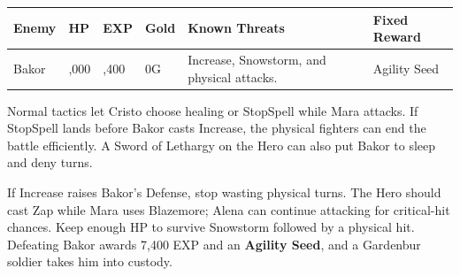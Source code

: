 \documentclass[
  american,
  10pt,
  letterpaper,
  oneside,
  open=any]{scrreprt}
\newcounter{none} %
\newenvironment{guidetable}{%
  \small\setstretch{1.0}%
  \setlength{\tabcolsep}{4pt}%
  \setlength{\LTpre}{8pt}\setlength{\LTpost}{10pt}%
  \renewcommand{\arraystretch}{1.16}%
}{ }
\begin{document}
\begin{guidetable}

{\def\LTcaptype{none} %
\begin{longtable}[]{@{}
  >{\raggedright\arraybackslash}p{}
  >{\raggedleft\arraybackslash}p{}
  >{\raggedleft\arraybackslash}p{}
  >{\raggedleft\arraybackslash}p{}
  >{\raggedright\arraybackslash}p{}
  >{\raggedright\arraybackslash}p{}@{}}
\toprule\noalign{}
\begin{minipage}[b]{\linewidth}\raggedright
\color{GuideGreen}\bfseries Enemy
\end{minipage} & \begin{minipage}[b]{\linewidth}\raggedleft
\color{GuideGreen}\bfseries HP
\end{minipage} & \begin{minipage}[b]{\linewidth}\raggedleft
\color{GuideGreen}\bfseries EXP
\end{minipage} & \begin{minipage}[b]{\linewidth}\raggedleft
\color{GuideGreen}\bfseries Gold
\end{minipage} & \begin{minipage}[b]{\linewidth}\raggedright
\color{GuideGreen}\bfseries Known Threats
\end{minipage} & \begin{minipage}[b]{\linewidth}\raggedright
\color{GuideGreen}\bfseries Fixed Reward
\end{minipage} \\
\midrule\noalign{}
\endhead
\bottomrule\noalign{}
\endlastfoot
Bakor & 1,000 & 7,400 & 0G & Increase, Snowstorm, and physical attacks.
& Agility Seed \\
\end{longtable}
}

\end{guidetable}

Normal tactics let Cristo choose healing or StopSpell while Mara
attacks. If StopSpell lands before Bakor casts Increase, the physical
fighters can end the battle efficiently. A Sword of Lethargy on the Hero
can also put Bakor to sleep and deny turns.

If Increase raises Bakor's Defense, stop wasting physical turns. The
Hero should cast Zap while Mara uses Blazemore; Alena can continue
attacking for critical-hit chances. Keep enough HP to survive Snowstorm
followed by a physical hit. Defeating Bakor awards 7,400 EXP and an
\textbf{Agility Seed}, and a Gardenbur soldier takes him into custody.
\end{document}
